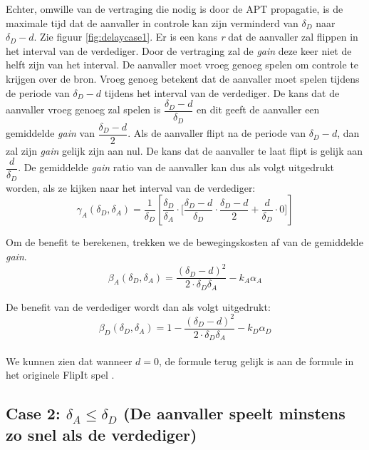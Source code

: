 \documentclass[master=cws, masteroption=vs,english]{kulemt}
\begin{document}
\begin{abstract*}
Echter, omwille van de vertraging die nodig is door de APT propagatie, is de maximale tijd dat de aanvaller in controle kan zijn verminderd van $\delta_{D}$ naar $\delta_{D}-d$. Zie figuur \ref{fig:delaycase1}.  Er is een kans \textit{r} dat de aanvaller zal flippen in het interval van de verdediger. Door de vertraging zal de \textit{gain} deze keer niet de helft zijn van het interval. De aanvaller moet vroeg genoeg spelen om controle te krijgen over de bron. Vroeg genoeg betekent dat de aanvaller moet spelen tijdens de periode van $\delta_{D}-d$ tijdens het interval van de verdediger. De kans dat de aanvaller vroeg genoeg zal spelen is $\dfrac{\delta_{D}-d}{\delta_{D}}$ en dit geeft de aanvaller een gemiddelde \textit{gain} van $\dfrac{\delta_{D}-d}{2}$. Als de aanvaller flipt na de periode van $\delta_{D}-d$, dan zal zijn \textit{gain} gelijk zijn aan nul. De kans dat de aanvaller te laat flipt is gelijk aan $\dfrac{d}{\delta_{D}}$. De gemiddelde \textit{gain} ratio van de aanvaller kan dus als volgt uitgedrukt worden, als ze kijken naar het interval van de verdediger:
\begin{equation*}
\gamma_{A}(\delta_{D},\delta_{A}) = \dfrac {1}{\delta_{D}} [ \dfrac{\delta_{D}}{\delta_{A}} \cdot \big[ \dfrac{\delta_{D}-d}{\delta_{D}} \cdot \dfrac{\delta_{D}-d}{2} + \dfrac{d}{\delta_{D}} \cdot 0 \big] ]
\end{equation*}

Om de benefit te berekenen, trekken we de bewegingskosten af van de gemiddelde \textit{gain}.
\begin{equation}\label{first}
\beta_{A}(\delta_{D},\delta_{A}) = \dfrac { (\delta_{D}-d) ^{2}} {2 \cdot \delta_{D}  \delta_{A}} - k_{A} \alpha_{A}
\end{equation}

 
De benefit van de verdediger wordt dan als volgt uitgedrukt:
 \begin{equation}\label{first}
\beta_{D}(\delta_{D},\delta_{A}) = 1 - \dfrac { (\delta_{D}-d) ^{2}} {2 \cdot \delta_{D}  \delta_{A}} - k_{D} \alpha_{D}
\end{equation}
~~\\
We kunnen zien dat wanneer $d=0$, de formule terug gelijk is aan de formule in het originele FlipIt spel \citep{FlipIt}. 

\subsection*{\textbf{Case 2:} $\delta_{A} \leq \delta_{D} $ (De aanvaller speelt minstens zo snel als de verdediger)}


\end{abstract*}
\end{document}
